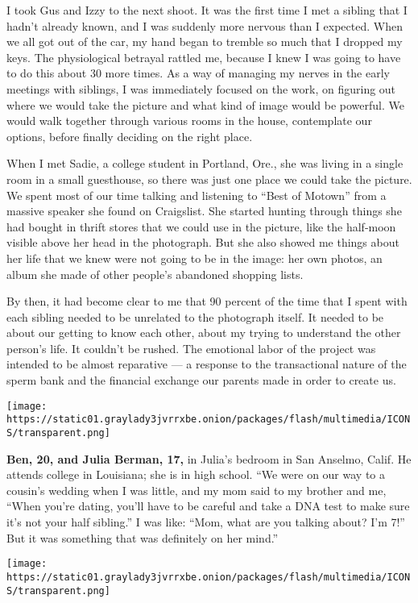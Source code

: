 I took Gus and Izzy to the next shoot. It was the first time I met a
sibling that I hadn't already known, and I was suddenly more nervous
than I expected. When we all got out of the car, my hand began to
tremble so much that I dropped my keys. The physiological betrayal
rattled me, because I knew I was going to have to do this about 30 more
times. As a way of managing my nerves in the early meetings with
siblings, I was immediately focused on the work, on figuring out where
we would take the picture and what kind of image would be powerful. We
would walk together through various rooms in the house, contemplate our
options, before finally deciding on the right place.

When I met Sadie, a college student in Portland, Ore., she was living in
a single room in a small guesthouse, so there was just one place we
could take the picture. We spent most of our time talking and listening
to ``Best of Motown'' from a massive speaker she found on Craigslist.
She started hunting through things she had bought in thrift stores that
we could use in the picture, like the half-moon visible above her head
in the photograph. But she also showed me things about her life that we
knew were not going to be in the image: her own photos, an album she
made of other people's abandoned shopping lists.

By then, it had become clear to me that 90 percent of the time that I
spent with each sibling needed to be unrelated to the photograph itself.
It needed to be about our getting to know each other, about my trying to
understand the other person's life. It couldn't be rushed. The emotional
labor of the project was intended to be almost reparative --- a response
to the transactional nature of the sperm bank and the financial exchange
our parents made in order to create us.

\texttt{[image: https://static01.graylady3jvrrxbe.onion/packages/flash/multimedia/ICONS/transparent.png]}

\textbf{Ben, 20, and Julia Berman, 17,} in Julia's bedroom in San
Anselmo, Calif. He attends college in Louisiana; she is in high school.
``We were on our way to a cousin's wedding when I was little, and my mom
said to my brother and me, ``When you're dating, you'll have to be
careful and take a DNA test to make sure it's not your half sibling.'' I
was like: ``Mom, what are you talking about? I'm 7!'' But it was
something that was definitely on her mind.''

\texttt{[image: https://static01.graylady3jvrrxbe.onion/packages/flash/multimedia/ICONS/transparent.png]}

